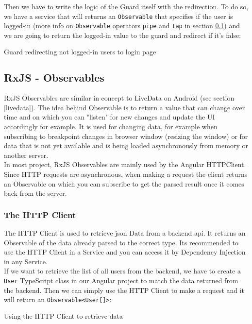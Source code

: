 \documentclass[twoside, openright,11pt,a4paper]{book}
\newenvironment{code}{\captionsetup{type=listing}}{}
\begin{document}
Then we have to write the logic of the Guard itself with the redirection. To do so, we have a service that will returns an \verb+Observable+ that specifies if the user is logged-in (more info on \verb+Observable+ operators \verb+pipe+ and \verb+tap+ in section \ref{observables}) and we are going to return the logged-in value to the guard and redirect if it's false:
\begin{code}
	\caption{Guard redirecting not logged-in users to login page}
	\label{authGuard}
\end{code}
\subsection{RxJS - Observables}
\label{observables}
RxJS Observables\cite{angular:doc:observables} are similar in concept to LiveData on Android (see section \ref{livedata}). The idea behind Observable is to return a value that can change over time and on which you can "listen" for new changes and update the UI accordingly for example. It is used for changing data, for example when subscribing to breakpoint changes in browser window (resizing the window) or for data that is not yet available and is being loaded asynchronously from memory or another server. \\

In most project, RxJS Observables are mainly used by the Angular HTTPClient\cite{angular:doc:http}. Since HTTP requests are asynchronous, when making a request the client returns an Observable on which you can subscribe to get the parsed result once it comes back from the server.\\

\subsubsection{The HTTP Client}
The HTTP Client is used to retrieve \gls{json} Data from a backend \gls{api}. It returns an Observable of the data already parsed to the correct type. Its recommended to use the HTTP Client in a Service and you can access it by Dependency Injection in any Service.\\

If we want to retrieve the list of all users from the backend, we have to create a \verb+User+ TypeScript class in our Angular project to match the data returned from the backend. Then we can simply use the HTTP Client to make a request and it will return an \verb+Observable<User[]>+:
\begin{code}
	\caption{Using the HTTP Client to retrieve data}
\end{code}
\end{document}
